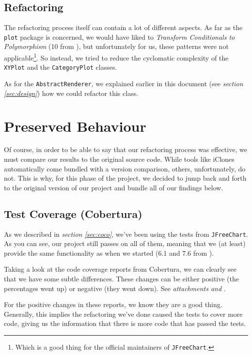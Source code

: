 \documentclass[11pt]{article}
\begin{document}
	\subsection{Refactoring}
	\label{sec:refactoring}
	The refactoring process itself can contain a lot of different aspects. As far as the \texttt{plot} package is concerned, we would have liked to \textsl{Transform Conditionals to Polymorphism} (10 from \cite{demeyer2009object}), but unfortunately for us, these patterns were not applicable\footnote{Which is a good thing for the official maintainers of \texttt{JFreeChart}.}. So instead, we tried to reduce the cyclomatic complexity of the \texttt{XYPlot} and the \texttt{CategoryPlot} classes.
	
	As for the \texttt{AbstractRenderer}, we explained earlier in this document (see \textsl{section \ref{sec:design}}) how we could refactor this class.
	
	\section{Preserved Behaviour}
	\label{sec:pb}
	Of course, in order to be able to say that our refactoring process was effective, we must compare our results to the original source code. While tools like \textsf{iClones} \cite{iclones} automatically come bundled with a version comparison, others, unfortunately, do not. This is why, for this phase of the project, we decided to jump back and forth to the original version of our project and bundle all of our findings below.
	
	\subsection{Test Coverage (Cobertura)}
	As we described in \textsl{section \ref{sec:coco}}, we've been using the tests from \texttt{JFreeChart}. As you can see, our project still passes on all of them, meaning that we (at least) provide the same functionality as when we started (6.1 and 7.6 from \cite{demeyer2009object}).
	
	Taking a look at the code coverage reports from \textsf{Cobertura}, we can clearly see that we have some subtle differences. These changes can be either positive (the percentages went up) or negative (they went down). See \textsl{attachments \pageref{cobertura-begin} and \pageref{cobertura-now}}.
	
	For the positive changes in these reports, we know they are a good thing. Generally, this implies the refactoring we've done caused the tests to cover more code, giving us the information that there is more code that has passed the tests.
	
\end{document}
